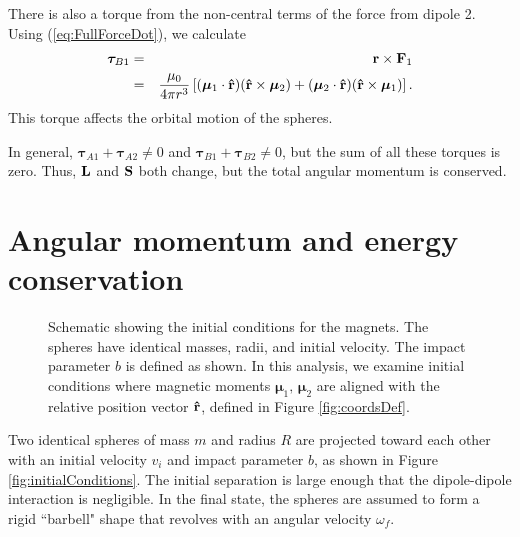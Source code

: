 \documentclass{article}
\begin{document}
There is also a torque from the non-central terms of the force from dipole 2. Using (\ref{eq:FullForceDot}), we calculate
\begin{eqnarray}
    \boldsymbol\tau_{B1} &=& \vb{r}\times \vb{F}_1 \nonumber \\
    &=& \frac{\mu_0}{4\pi r^3} \left[ (    \bm{\mu}_1 \cdot \vu{r})(\vu{r} \times     \bm{\mu}_2) + (    \bm{\mu}_2 \cdot \vu{r})(\vu{r}\times     \bm{\mu}_1) \right]. \label{eq:torqueB}
\end{eqnarray}
This torque affects the orbital motion of the spheres.

In general, $\boldsymbol\tau_{A1}+\boldsymbol\tau_{A2}\neq 0$ and $\boldsymbol\tau_{B1}+\boldsymbol\tau_{B2}\neq 0$, but the sum of all these torques is zero.  Thus,  $\vb{L}$ and $\vb{S}$ both change, but the total angular momentum is conserved.

\section{Angular momentum and energy conservation}

\begin{figure}
    \centering
    \caption{Schematic showing the initial conditions for the magnets. The spheres have identical masses, radii, and initial velocity. The impact parameter $b$ is defined as shown. In this analysis, we examine initial conditions where magnetic moments $\bm{\mu}_1, \, \bm{\mu}_2$ are aligned with the relative position vector $\vu{r}$, defined in Figure \ref{fig:coordsDef}. \label{fig:initialConditions}}
    \label{fig:my_label}
\end{figure}

 Two identical spheres of mass $m$ and radius $R$ are projected toward each other with an initial velocity $v_i $ and impact parameter $b$, as shown in Figure \ref{fig:initialConditions}.
 The initial separation is large enough that the dipole-dipole interaction is negligible. 
 In the final state, the spheres are assumed to form a rigid ``barbell" shape that revolves with an angular velocity $\omega_f$.
\end{document}
